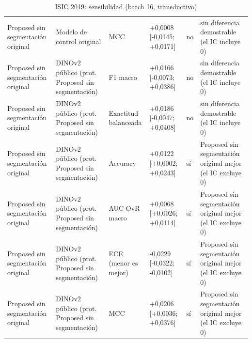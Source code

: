 \begin{table}[ht]
{\begin{tabular}{@{}llllll@{}}
Proposed sin segmentación original & Modelo de control original & MCC & +0,0008 [-0,0145; +0,0171] & no & sin diferencia demostrable (el IC incluye 0) \\
Proposed sin segmentación original & DINOv2 público (prot. Proposed sin segmentación) & F1 macro & +0,0166 [-0,0073; +0,0386] & no & sin diferencia demostrable (el IC incluye 0) \\
Proposed sin segmentación original & DINOv2 público (prot. Proposed sin segmentación) & Exactitud balanceada & +0,0186 [-0,0047; +0,0408] & no & sin diferencia demostrable (el IC incluye 0) \\
Proposed sin segmentación original & DINOv2 público (prot. Proposed sin segmentación) & Accuracy & +0,0122 [+0,0002; +0,0243] & sí & Proposed sin segmentación original mejor (el IC excluye 0) \\
Proposed sin segmentación original & DINOv2 público (prot. Proposed sin segmentación) & AUC OvR macro & +0,0068 [+0,0026; +0,0114] & sí & Proposed sin segmentación original mejor (el IC excluye 0) \\
Proposed sin segmentación original & DINOv2 público (prot. Proposed sin segmentación) & ECE (menor es mejor) & -0,0229 [-0,0322; -0,0102] & sí & Proposed sin segmentación original mejor (el IC excluye 0) \\
Proposed sin segmentación original & DINOv2 público (prot. Proposed sin segmentación) & MCC & +0,0206 [+0,0036; +0,0376] & sí & Proposed sin segmentación original mejor (el IC excluye 0) \\
\bottomrule
\end{tabular}}
\caption{ISIC 2019: sensibilidad (batch 16, transductivo)}\label{tab:contrast-isic2019-sens}
\end{table}


